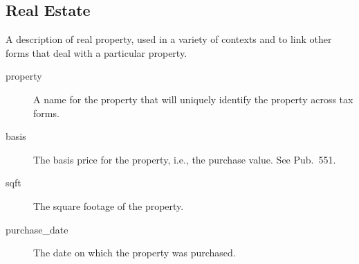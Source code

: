 \subsection{Real Estate}

A description of real property, used in a variety of contexts and to link other
forms that deal with a particular property.

\begin{description}
\item[property] A name for the property that will uniquely identify the property
across tax forms.
\item[basis] The basis price for the property, i.e., the purchase value. See
Pub.\ 551.
\item[sqft] The square footage of the property.
\item[purchase\_date] The date on which the property was purchased.
\end{description}




